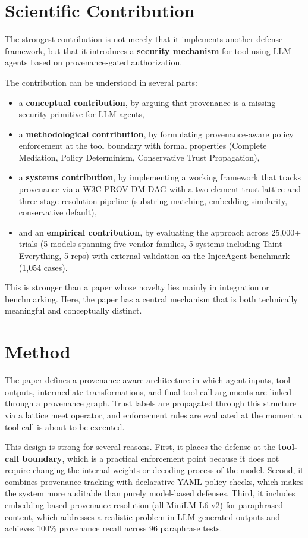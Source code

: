 \documentclass[11pt]{article}
\begin{document}
\section*{Scientific Contribution}

The strongest contribution is not merely that it implements another defense framework, but that it introduces a \textbf{security mechanism} for tool-using LLM agents based on provenance-gated authorization.

The contribution can be understood in several parts:
\begin{itemize}[leftmargin=1.5em]
    \item a \textbf{conceptual contribution}, by arguing that provenance is a missing security primitive for LLM agents,
    \item a \textbf{methodological contribution}, by formulating provenance-aware policy enforcement at the tool boundary with formal properties (Complete Mediation, Policy Determinism, Conservative Trust Propagation),
    \item a \textbf{systems contribution}, by implementing a working framework that tracks provenance via a W3C PROV-DM DAG with a two-element trust lattice and three-stage resolution pipeline (substring matching, embedding similarity, conservative default),
    \item and an \textbf{empirical contribution}, by evaluating the approach across 25,000+ trials (5 models spanning five vendor families, 5 systems including Taint-Everything, 5 reps) with external validation on the InjecAgent benchmark (1,054 cases).
\end{itemize}

This is stronger than a paper whose novelty lies mainly in integration or benchmarking. Here, the paper has a central mechanism that is both technically meaningful and conceptually distinct.

\section*{Method}

The paper defines a provenance-aware architecture in which agent inputs, tool outputs, intermediate transformations, and final tool-call arguments are linked through a provenance graph. Trust labels are propagated through this structure via a lattice meet operator, and enforcement rules are evaluated at the moment a tool call is about to be executed.

This design is strong for several reasons. First, it places the defense at the \textbf{tool-call boundary}, which is a practical enforcement point because it does not require changing the internal weights or decoding process of the model. Second, it combines provenance tracking with declarative YAML policy checks, which makes the system more auditable than purely model-based defenses. Third, it includes embedding-based provenance resolution (all-MiniLM-L6-v2) for paraphrased content, which addresses a realistic problem in LLM-generated outputs and achieves 100\% provenance recall across 96 paraphrase tests.
\end{document}
